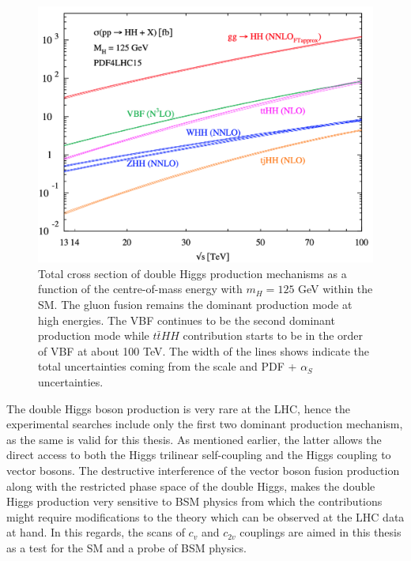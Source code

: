 \begin{figure}[ht]
	\centering
	\includegraphics[scale=0.6]{MSc_Thesis/fig/HHxsecfigure.png}
	\vspace{2mm}
	\caption[Total cross section of double Higgs production mechanisms as a function of the centre-of-mass energy with $m_H = 125$ GeV within the SM. The gluon fusion remains the dominant production mode at high energies. The VBF continues to be the second dominant production mode while $t\bar tHH$ contribution starts to be in the order of VBF at about 100 TeV. The width of the lines shows indicate the total uncertainties coming from the scale and PDF + $\alpha_S$ uncertainties.]
	{Total cross section of double Higgs production mechanisms as a function of the centre-of-mass energy with $m_H = 125$ GeV within the SM. The gluon fusion remains the dominant production mode at high energies. The VBF continues to be the second dominant production mode while $t\bar tHH$ contribution starts to be in the order of VBF at about 100 TeV. The width of the lines shows indicate the total uncertainties coming from the scale and PDF + $\alpha_S$ uncertainties\cite{DiMicco:2690841}.}
	\label{HHxsecfigure}
\end{figure}

The double Higgs boson production is very rare at the LHC, hence the experimental searches include only the first two dominant production mechanism, as the same is valid for this thesis. As mentioned earlier, the latter allows the direct access to both the Higgs trilinear self-coupling and the Higgs coupling to vector bosons. The destructive interference of the vector boson fusion production along with the restricted phase space of the double Higgs, makes the double Higgs production very sensitive to BSM physics from which the contributions might require modifications to the theory which can be observed at the LHC data at hand. In this regards, the scans of $c_v$ and $c_{2v}$ couplings are aimed in this thesis as a test for the SM and a probe of BSM physics.

